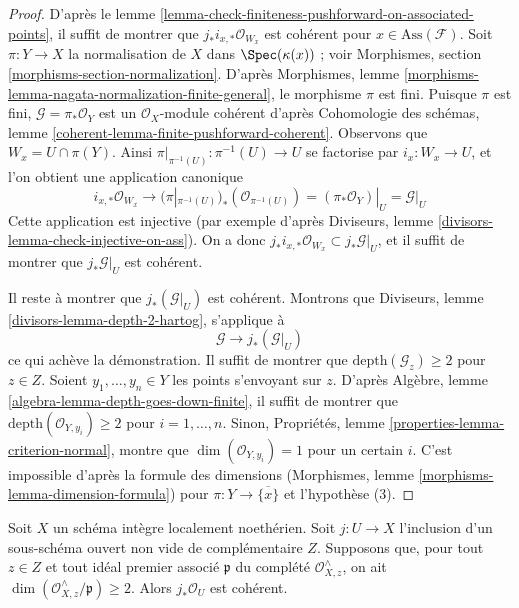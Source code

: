 \begin{proof}
D'après le lemme \ref{lemma-check-finiteness-pushforward-on-associated-points}, il suffit de montrer que $j_*i_{x, *}\mathcal{O}_{W_x}$ est cohérent pour $x \in \text{Ass}(\mathcal{F})$. Soit $\pi : Y \to X$ la normalisation de $X$ dans $\Spec(\kappa(x))$ ; voir Morphismes, section \ref{morphisms-section-normalization}. D'après Morphismes, lemme \ref{morphisms-lemma-nagata-normalization-finite-general}, le morphisme $\pi$ est fini. Puisque $\pi$ est fini, $\mathcal{G} = \pi_*\mathcal{O}_Y$ est un $\mathcal{O}_X$-module cohérent d'après Cohomologie des schémas, lemme \ref{coherent-lemma-finite-pushforward-coherent}. Observons que $W_x = U \cap \pi(Y)$. Ainsi $\pi|_{\pi^{-1}(U)} : \pi^{-1}(U) \to U$ se factorise par $i_x : W_x \to U$, et l'on obtient une application canonique
$$
i_{x, *}\mathcal{O}_{W_x}
\longrightarrow
(\pi|_{\pi^{-1}(U)})_*(\mathcal{O}_{\pi^{-1}(U)}) =
(\pi_*\mathcal{O}_Y)|_U = \mathcal{G}|_U
$$
Cette application est injective (par exemple d'après Diviseurs, lemme \ref{divisors-lemma-check-injective-on-ass}). On a donc $j_*i_{x, *}\mathcal{O}_{W_x} \subset j_*\mathcal{G}|_U$, et il suffit de montrer que $j_*\mathcal{G}|_U$ est cohérent.

\medskip\noindent
Il reste à montrer que $j_*(\mathcal{G}|_U)$ est cohérent. Montrons que Diviseurs, lemme \ref{divisors-lemma-depth-2-hartog}, s'applique à
$$
\mathcal{G} \longrightarrow j_*(\mathcal{G}|_U)
$$
ce qui achève la démonstration. Il suffit de montrer que $\text{depth}(\mathcal{G}_z) \geq 2$ pour $z \in Z$. Soient $y_1, \ldots, y_n \in Y$ les points s'envoyant sur $z$. D'après Algèbre, lemme \ref{algebra-lemma-depth-goes-down-finite}, il suffit de montrer que $\text{depth}(\mathcal{O}_{Y, y_i}) \geq 2$ pour $i = 1, \ldots, n$. Sinon, Propriétés, lemme \ref{properties-lemma-criterion-normal}, montre que $\dim(\mathcal{O}_{Y, y_i}) = 1$ pour un certain $i$. C'est impossible d'après la formule des dimensions (Morphismes, lemme \ref{morphisms-lemma-dimension-formula}) pour $\pi : Y \to \overline{\{x\}}$ et l'hypothèse (3).
\end{proof}

\begin{lemma}
\label{lemma-sharp-finiteness-pushforward}
Soit $X$ un schéma intègre localement noethérien. Soit $j : U \to X$ l'inclusion d'un sous-schéma ouvert non vide de complémentaire $Z$. Supposons que, pour tout $z \in Z$ et tout idéal premier associé $\mathfrak p$ du complété $\mathcal{O}_{X, z}^\wedge$, on ait $\dim(\mathcal{O}_{X, z}^\wedge/\mathfrak p) \geq 2$. Alors $j_*\mathcal{O}_U$ est cohérent.
\end{lemma}


